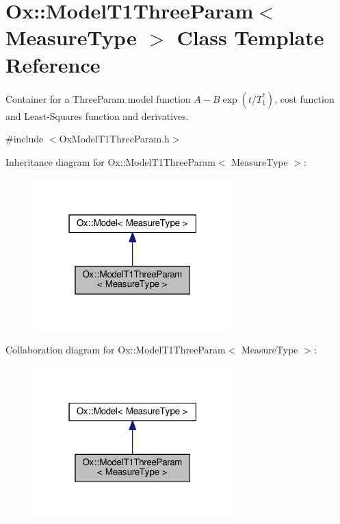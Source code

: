 \hypertarget{class_ox_1_1_model_t1_three_param}{}\section{Ox\+:\+:Model\+T1\+Three\+Param$<$ Measure\+Type $>$ Class Template Reference}
\label{class_ox_1_1_model_t1_three_param}


Container for a Three\+Param model function $ A-B\exp(t/T_1^*) $, cost function and Least-\/\+Squares function and derivatives.  




{\ttfamily \#include $<$Ox\+Model\+T1\+Three\+Param.\+h$>$}



Inheritance diagram for Ox\+:\+:Model\+T1\+Three\+Param$<$ Measure\+Type $>$\+:
\nopagebreak
\begin{figure}[H]
\begin{center}
\leavevmode
\includegraphics[width=219pt]{class_ox_1_1_model_t1_three_param__inherit__graph}
\end{center}
\end{figure}


Collaboration diagram for Ox\+:\+:Model\+T1\+Three\+Param$<$ Measure\+Type $>$\+:
\nopagebreak
\begin{figure}[H]
\begin{center}
\leavevmode
\includegraphics[width=219pt]{class_ox_1_1_model_t1_three_param__coll__graph}
\end{center}
\end{figure}
